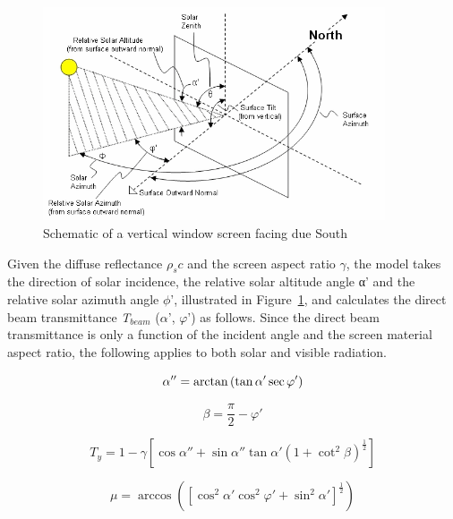\begin{figure}[hbtp] %
\centering
\includegraphics[width=0.9\textwidth, height=0.9\textheight, keepaspectratio=true]{media/image1154.png}
\caption{Schematic of a vertical window screen facing due South \protect \label{fig:schematic-of-a-vertical-window-screen-facing}}
\end{figure}

Given the diffuse reflectance \(\rho_sc\) and the screen aspect ratio \(\gamma\), the model takes the direction of solar incidence, the relative solar altitude angle α' and the relative solar azimuth angle \(\phi\)', illustrated in Figure~\ref{fig:schematic-of-a-vertical-window-screen-facing}, and calculates the direct beam transmittance \emph{T\(_{beam}\)} (\(\alpha\)', \(\varphi\)') as follows. Since the direct beam transmittance is only a function of the incident angle and the screen material aspect ratio, the following applies to both solar and visible radiation.

\begin{equation}
\alpha '' = {\rm{arctan}}\left( {\tan \alpha '\sec \varphi '} \right)
\end{equation}

\begin{equation}
\beta  = \frac{\pi }{2} - \varphi '
\end{equation}

\begin{equation}
{T_y} = 1 - \gamma \left[ {\cos \alpha '' + \sin \alpha ''\tan \alpha '{{\left( {1 + {{\cot }^2}\beta } \right)}^{\frac{1}{2}}}} \right]
\end{equation}

\begin{equation}
\mu  = \arccos \left( {{{\left[ {{{\cos }^2}\alpha '{{\cos }^2}\varphi ' + {{\sin }^2}\alpha '} \right]}^{\frac{1}{2}}}} \right)
\end{equation}

